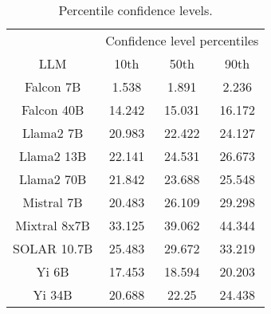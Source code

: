 \begin{table*}
\centering
\begin{tabular}{c|c|c|c}
& \multicolumn{3}{c}{Confidence level percentiles} \\ 
LLM & 10th & 50th & 90th\\ \hline
Falcon 7B & 1.538 & 1.891 & 2.236\\
Falcon 40B & 14.242 & 15.031 & 16.172\\
Llama2 7B & 20.983 & 22.422 & 24.127\\
Llama2 13B & 22.141 & 24.531 & 26.673\\
Llama2 70B & 21.842 & 23.688 & 25.548\\
Mistral 7B & 20.483 & 26.109 & 29.298\\
Mixtral 8x7B & 33.125 & 39.062 & 44.344\\
SOLAR 10.7B & 25.483 & 29.672 & 33.219\\
Yi 6B & 17.453 & 18.594 & 20.203\\
Yi 34B & 20.688 & 22.25 & 24.438\\
\hline
\end{tabular}
\caption{Percentile confidence levels.}
\label{tab:percentile_conf}
\end{table*}
